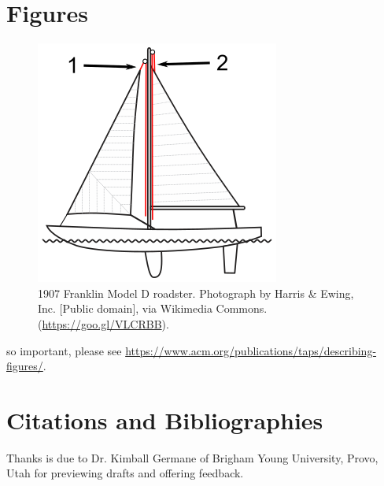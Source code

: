 \documentclass[sigconf]{acmart}
\begin{document}
\section{Figures}

\begin{figure}[h]
  \centering
  \includegraphics[width=\linewidth]{img/Halyard}
  \caption{1907 Franklin Model D roadster. Photograph by Harris \&
    Ewing, Inc. [Public domain], via Wikimedia
    Commons. (\url{https://goo.gl/VLCRBB}).}
\end{figure}

so important, please see
\url{https://www.acm.org/publications/taps/describing-figures/}.

\section{Citations and Bibliographies}

\begin{acks}
    Thanks is due to Dr. Kimball Germane of Brigham Young University, Provo,
    Utah for previewing drafts and offering feedback.
\end{acks}



\end{document}
